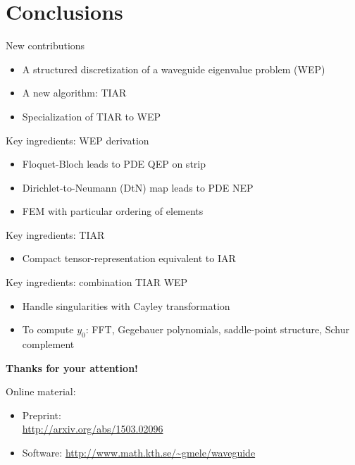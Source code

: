 \documentclass[10pt]{beamer}
\begin{document}
\section{Conclusions}
\begin{frame}
\begin{block}{New contributions}
  \begin{itemize}
    \item A structured discretization of a waveguide eigenvalue problem (WEP)
    \item A new algorithm: TIAR
    \item Specialization of TIAR to WEP
  \end{itemize}
\end{block}\pause
Key ingredients: WEP derivation
\begin{itemize}
  \item Floquet-Bloch leads to PDE QEP on strip
  \item Dirichlet-to-Neumann (DtN) map leads to PDE NEP 
  \item FEM with particular ordering of elements
\end{itemize}
Key ingredients: TIAR
\begin{itemize}
  \item Compact tensor-representation equivalent to IAR
\end{itemize}
Key ingredients: combination TIAR WEP
\begin{itemize}
  \item Handle singularities with Cayley transformation
  \item To compute $y_0$: FFT, Gegebauer polynomials, saddle-point structure, Schur complement
\end{itemize}
\end{frame}
\begin{frame}
\begin{center}
\Large
\bf Thanks for your attention!\\\vspace{0.5cm}
\end{center}
\medskip
Online material:
\begin{itemize}
  \item Preprint: \\\url{http://arxiv.org/abs/1503.02096}
  \item Software: \url{http://www.math.kth.se/~gmele/waveguide}
\end{itemize}

\end{frame}
%
%
%
\end{document}
